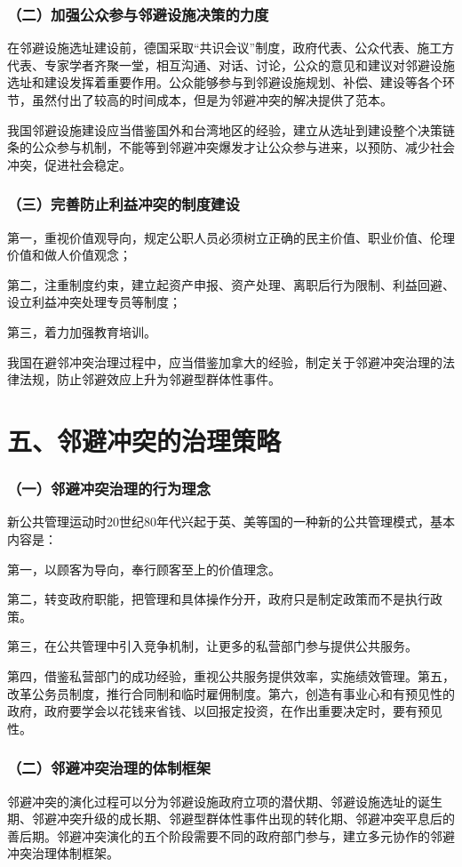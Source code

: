 \documentclass[aspectratio=169, 12pt]{beamer}
\begin{document}
\begin{frame}[plain]
    \frametitle{（二）加强公众参与邻避设施决策的力度}
    在邻避设施选址建设前，德国采取“共识会议”制度，政府代表、公众代表、施工方代表、专家学者齐聚一堂，相互沟通、对话、讨论，公众的意见和建议对邻避设施选址和建设发挥着重要作用。公众能够参与到邻避设施规划、补偿、建设等各个环节，虽然付出了较高的时间成本，但是为邻避冲突的解决提供了范本。
    \par
    我国邻避设施建设应当借鉴国外和台湾地区的经验，建立从选址到建设整个决策链条的公众参与机制，不能等到邻避冲突爆发才让公众参与进来，以预防、减少社会冲突，促进社会稳定。
\end{frame}

\begin{frame}[plain]
    \frametitle{（三）完善防止利益冲突的制度建设}
    第一，重视价值观导向，规定公职人员必须树立正确的民主价值、职业价值、伦理价值和做人价值观念；
    \par
    第二，注重制度约束，建立起资产申报、资产处理、离职后行为限制、利益回避、设立利益冲突处理专员等制度；
    \par
    第三，着力加强教育培训。
    \par
    我国在避邻冲突治理过程中，应当借鉴加拿大的经验，制定关于邻避冲突治理的法律法规，防止邻避效应上升为邻避型群体性事件。
\end{frame}

\section{五、邻避冲突的治理策略}

\begin{frame}[plain]
    \frametitle{（一）邻避冲突治理的行为理念}
    新公共管理运动时20世纪80年代兴起于英、美等国的一种新的公共管理模式，基本内容是：
    \par
    第一，以顾客为导向，奉行顾客至上的价值理念。
    \par
    第二，转变政府职能，把管理和具体操作分开，政府只是制定政策而不是执行政策。
    \par
    第三，在公共管理中引入竞争机制，让更多的私营部门参与提供公共服务。
    \par
    第四，借鉴私营部门的成功经验，重视公共服务提供效率，实施绩效管理。第五，改革公务员制度，推行合同制和临时雇佣制度。第六，创造有事业心和有预见性的政府，政府要学会以花钱来省钱、以回报定投资，在作出重要决定时，要有预见性。
\end{frame}

\begin{frame}[plain]
    \frametitle{（二）邻避冲突治理的体制框架}
    邻避冲突的演化过程可以分为邻避设施政府立项的潜伏期、邻避设施选址的诞生期、邻避冲突升级的成长期、邻避型群体性事件出现的转化期、邻避冲突平息后的善后期。邻避冲突演化的五个阶段需要不同的政府部门参与，建立多元协作的邻避冲突治理体制框架。
\end{frame}
\end{document}
